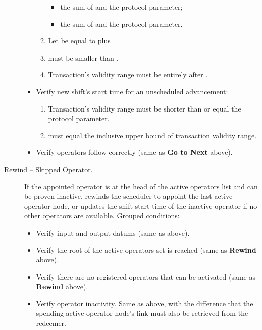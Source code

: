 \documentclass[../midgard.tex]{subfiles}
\begin{document}
\begin{description}
\begin{itemize}
\begin{enumerate}[resume]
\begin{itemize}
                \item the sum of  and the  protocol parameter;
                \item the sum of  and the  protocol parameter.
              \end{itemize}
            \item Let  be equal to  plus .
            \item {} must be smaller than .
            \item Transaction's validity range must be entirely after .
          \end{enumerate}
        \item Verify new shift's start time for an unscheduled advancement:
          \begin{enumerate}[resume]
            \item Transaction's validity range must be shorter than or equal the  protocol parameter.
            \item {} must equal the inclusive upper bound of transaction validity range.
          \end{enumerate}
        \item Verify operators follow correctly (same as \textbf{Go to Next} above).
      \end{itemize}
    \item[Rewind -- Skipped Operator.] If the appointed operator is at the head of the active operators list and can be proven inactive, rewinds the scheduler to appoint the last active operator node, or updates the shift start time of the inactive operator if no other operators are available.
      Grouped conditions:
      \begin{itemize}
        \item Verify input and output datums (same as above).
        \item Verify the root of the active operators set is reached (same as \textbf{Rewind} above).
        \item Verify there are no registered operators that can be activated (same as \textbf{Rewind} above).
        \item Verify operator inactivity.
          Same as above, with the difference that the spending active operator node's link must also be retrieved from the  redeemer.

\end{itemize}
\end{description}
\end{document}
